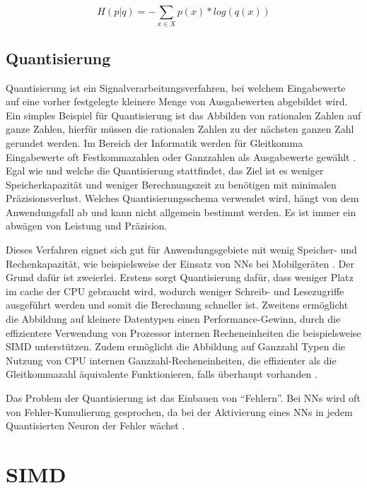 \begin{equation}
  H(p|q) = -\sum_{x \in X} p(x) * log(q(x))
  \label{equation:crossentropy}
\end{equation}


\subsection{Quantisierung}

Quantisierung ist ein Signalverarbeitungsverfahren, bei welchem Eingabewerte auf eine vorher festgelegte kleinere Menge von Ausgabewerten abgebildet wird. Ein simples Beispiel für Quantisierung ist das Abbilden von rationalen Zahlen auf ganze Zahlen, hierfür müssen die rationalen Zahlen zu der nächsten ganzen Zahl gerundet werden. Im Bereich der Informatik werden für Gleitkomma Eingabewerte oft Festkommazahlen oder Ganzzahlen als Ausgabewerte gewählt \cite{Gysel2016}. Egal wie und welche die Quantisierung stattfindet, das Ziel ist es weniger Speicherkapazität und weniger Berechnungszeit zu benötigen mit minimalen Präzisionsverlust. Welches Quantisierungsschema verwendet wird, hängt von dem Anwendungsfall ab und kann nicht allgemein bestimmt werden. Es ist immer ein abwägen von Leistung und Präzision.

Dieses Verfahren eignet sich gut für Anwendungsgebiete mit wenig Speicher- und Rechenkapazität, wie beispielsweise der Einsatz von \acp{NN} bei Mobilgeräten \cite{MaQuantization2019, Gysel2016}. Der Grund dafür ist zweierlei. Erstens sorgt Quantisierung dafür, dass weniger Platz im cache der CPU gebraucht wird, wodurch weniger Schreib- und Lesezugriffe ausgeführt werden und somit die Berechnung schneller ist. Zweitens ermöglicht die Abbildung auf kleinere Datentypen einen Performance-Gewinn, durch die effizientere Verwendung von Prozessor internen Recheneinheiten die beispielsweise \ac{SIMD} unterstützen. Zudem ermöglicht die Abbildung auf Ganzzahl Typen die Nutzung von CPU internen Ganzzahl-Recheneinheiten, die effizienter als die Gleitkommazahl äquivalente Funktionieren, falls überhaupt vorhanden \cite{Jacob2017}.

Das Problem der Quantisierung ist das Einbauen von \enquote{Fehlern}. Bei \acp{NN} wird oft von Fehler-Kumulierung gesprochen, da bei der Aktivierung eines \acp{NN} in jedem Quantisierten Neuron der Fehler wächst \cite{Park2018}.

\section{SIMD}

